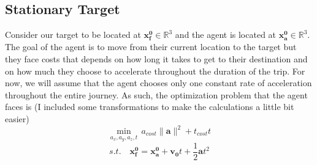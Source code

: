 \documentclass[11pt,english]{article}
\begin{document}
\subsection*{Stationary Target}

\noindent Consider our target to be located at $\mathbf{x_f^0}\in \mathbb{R}^3$ and the agent is located at $\mathbf{x_a^0}\in \mathbb{R}^3$. The goal of the agent is to move from their current location to the target but they face costs that depends on how long it takes to get to their destination and on how much they choose to accelerate throughout the duration of the trip. For now, we will assume that the agent chooses only one constant rate of acceleration throughout the entire journey. As such, the optimization problem that the agent faces is (I included some transformations to make the calculations a little bit easier) $$\min_{a_x,a_y,a_z,t}\,a_{cost}\lVert\mathbf{a}\rVert^2 + t_{cost}t$$ $$s.t. \quad \mathbf{x_f^0} = \mathbf{x_a^0} + \mathbf{v_0}t + \frac{1}{2}\mathbf{a}t^2$$
\end{document}
